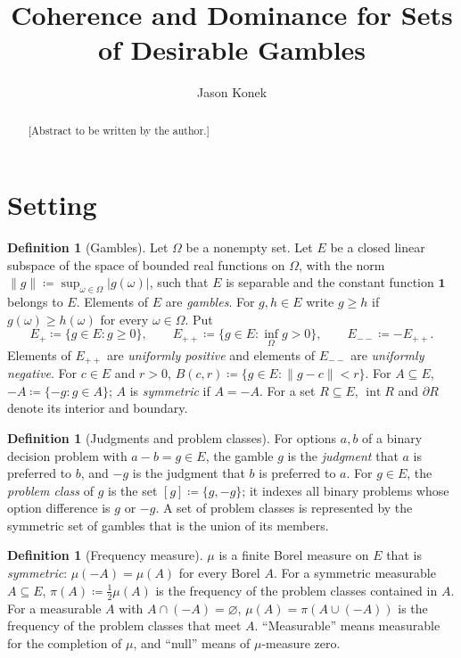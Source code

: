 \documentclass[11pt]{article}
\title{Coherence and Dominance for Sets of Desirable Gambles}
\author{Jason Konek}
\date{}
\theoremstyle{definition}
\newtheorem{definition}[theorem]{Definition}
\newcommand{\one}{\mathbf 1}
\newcommand{\interior}{\operatorname{int}}
\newcommand{\bd}{\partial}
\begin{document}
\maketitle

\begin{abstract}
[Abstract to be written by the author.]
\end{abstract}

\section{Setting}\label{sec:setting}

\begin{definition}[Gambles]\label{def:gambles}
Let $\Omega$ be a nonempty set. Let $E$ be a closed linear subspace of the space of bounded real functions on $\Omega$, with the norm $\|g\|\coloneqq\sup_{\omega\in\Omega}|g(\omega)|$, such that $E$ is separable and the constant function $\one$ belongs to $E$. Elements of $E$ are \emph{gambles}. For $g,h\in E$ write $g\ge h$ if $g(\omega)\ge h(\omega)$ for every $\omega\in\Omega$. Put
\[
E_+\coloneqq\{g\in E:g\ge0\},\qquad E_{++}\coloneqq\{g\in E:\inf_{\Omega}g>0\},\qquad E_{--}\coloneqq -E_{++}.
\]
Elements of $E_{++}$ are \emph{uniformly positive} and elements of $E_{--}$ are \emph{uniformly negative}. For $c\in E$ and $r>0$, $B(c,r)\coloneqq\{g\in E:\|g-c\|<r\}$. For $A\subseteq E$, $-A\coloneqq\{-g:g\in A\}$; $A$ is \emph{symmetric} if $A=-A$. For a set $R\subseteq E$, $\interior R$ and $\bd R$ denote its interior and boundary.
\end{definition}

\begin{definition}[Judgments and problem classes]\label{def:judgments}
For options $a,b$ of a binary decision problem with $a-b=g\in E$, the gamble $g$ is the \emph{judgment} that $a$ is preferred to $b$, and $-g$ is the judgment that $b$ is preferred to $a$. For $g\in E$, the \emph{problem class} of $g$ is the set $[g]\coloneqq\{g,-g\}$; it indexes all binary problems whose option difference is $g$ or $-g$. A set of problem classes is represented by the symmetric set of gambles that is the union of its members.
\end{definition}

\begin{definition}[Frequency measure]\label{def:frequency}
$\mu$ is a finite Borel measure on $E$ that is \emph{symmetric}: $\mu(-A)=\mu(A)$ for every Borel $A$. For a symmetric measurable $A\subseteq E$, $\pi(A)\coloneqq\tfrac12\mu(A)$ is the frequency of the problem classes contained in $A$. For a measurable $A$ with $A\cap(-A)=\varnothing$, $\mu(A)=\pi(A\cup(-A))$ is the frequency of the problem classes that meet $A$. ``Measurable'' means measurable for the completion of $\mu$, and ``null'' means of $\mu$-measure zero.
\end{definition}
\end{document}
